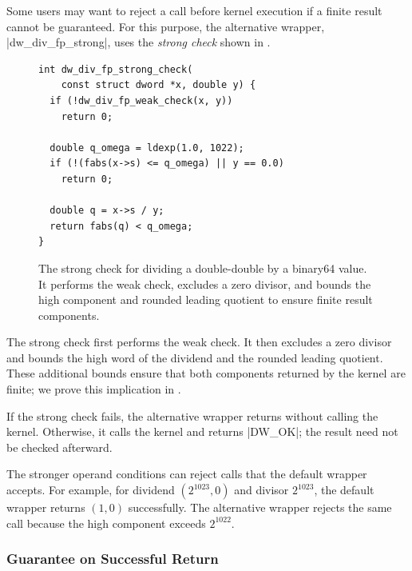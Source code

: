 Some users may want to reject a call before kernel execution if a
finite result cannot be guaranteed. For this purpose,
the alternative wrapper, \ccode|dw_div_fp_strong|, uses the
\emph{strong check} shown in .

\begin{figure}[t]
  \begin{sectiontwocpanel}
  \begin{lstlisting}[style=sectiontwoc]
int dw_div_fp_strong_check(
    const struct dword *x, double y) {
  if (!dw_div_fp_weak_check(x, y))
    return 0;

  double q_omega = ldexp(1.0, 1022);
  if (!(fabs(x->s) <= q_omega) || y == 0.0)
    return 0;

  double q = x->s / y;
  return fabs(q) < q_omega;
}
\end{lstlisting}
  \end{sectiontwocpanel}
\caption{The strong check for dividing a double-double by a binary64
value. It performs the weak check, excludes a zero divisor, and
bounds the high component and rounded leading quotient to ensure
finite result components.}
  \label{fig:dw-div-fp-check}
\end{figure}

The strong check first performs the weak check. It then excludes a
zero divisor and bounds the high word of the dividend and the 
rounded leading quotient. These additional bounds ensure
that both components returned by the kernel are finite; we prove this
implication in .

\begingroup
\setlength{\emergencystretch}{1em}
If the strong check fails, the alternative wrapper returns
without calling the kernel. Otherwise, it calls the kernel and returns
\ccode|DW_OK|; the result need not be checked afterward.
\par
\endgroup

The stronger operand conditions can reject calls that the default
wrapper accepts. For example, for dividend $(2^{1023},0)$ and divisor
$2^{1023}$, the default wrapper returns $(1,0)$ successfully. The
alternative wrapper rejects the same call because the high component
exceeds $2^{1022}$.

\subsubsection{Guarantee on Successful Return}
\label{sec:overview-division-guarantee}

